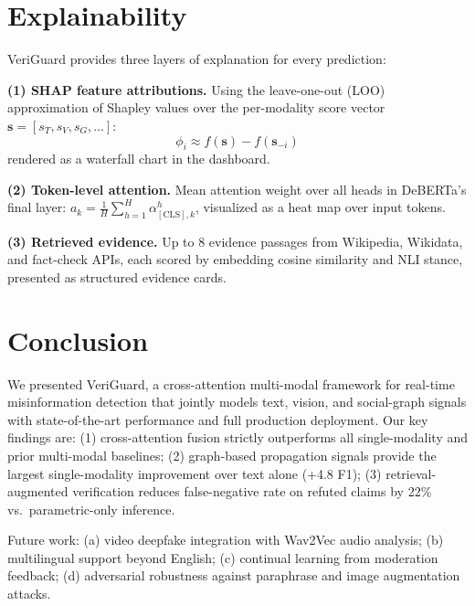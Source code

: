 \documentclass[11pt,a4paper]{article}
\begin{document}
\section{Explainability}
\label{sec:explain}

VeriGuard provides three layers of explanation for every prediction:

\textbf{(1) SHAP feature attributions.}
Using the leave-one-out (LOO) approximation of Shapley values over
the per-modality score vector $\mathbf{s} = [s_T, s_V, s_G, \ldots]$:
\begin{equation}
  \phi_i \approx f(\mathbf{s}) - f(\mathbf{s}_{-i})
\end{equation}
rendered as a waterfall chart in the dashboard.

\textbf{(2) Token-level attention.}
Mean attention weight over all heads in DeBERTa's final layer:
$a_k = \frac{1}{H} \sum_{h=1}^H \alpha^h_{[\text{CLS}], k}$, visualized
as a heat map over input tokens.

\textbf{(3) Retrieved evidence.}
Up to 8 evidence passages from Wikipedia, Wikidata, and fact-check APIs,
each scored by embedding cosine similarity and NLI stance, presented as
structured evidence cards.

\section{Conclusion}
\label{sec:conclusion}

We presented VeriGuard, a cross-attention multi-modal framework for
real-time misinformation detection that jointly models text, vision, and
social-graph signals with state-of-the-art performance and full
production deployment. Our key findings are: (1) cross-attention fusion
strictly outperforms all single-modality and prior multi-modal baselines;
(2) graph-based propagation signals provide the largest single-modality
improvement over text alone (+4.8 F1); (3) retrieval-augmented
verification reduces false-negative rate on refuted claims by 22\%
vs.\ parametric-only inference.

Future work: (a) video deepfake integration with Wav2Vec audio analysis;
(b) multilingual support beyond English; (c) continual learning from
moderation feedback; (d) adversarial robustness against paraphrase and
image augmentation attacks.

\end{document}
